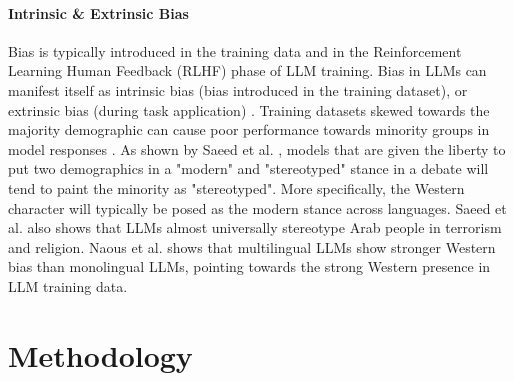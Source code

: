 \documentclass[sigconf]{acmart}
\begin{document}
\paragraph{Intrinsic \& Extrinsic Bias} Bias is typically introduced in the training data and in the Reinforcement Learning Human Feedback (RLHF) phase of LLM training. Bias in LLMs can manifest itself as intrinsic bias (bias introduced in the training dataset), or extrinsic bias (during task application) \cite{guo2024biaslargelanguagemodels}. Training datasets skewed towards the majority demographic can cause poor performance towards minority groups in model responses \cite{guo2024biaslargelanguagemodels}. As shown by Saeed et al. \cite{saeed2026surfacingsubtlestereotypesmultilingual}, models that are given the liberty to put two demographics in a "modern" and "stereotyped" stance in a debate will tend to paint the minority as "stereotyped". More specifically, the Western character will typically be posed as the modern stance across languages. Saeed et al. \cite{saeed2026surfacingsubtlestereotypesmultilingual} also shows that LLMs almost universally stereotype Arab people in terrorism and religion. Naous et al. \cite{naous-etal-2024-beer} shows that multilingual LLMs show stronger Western bias than monolingual LLMs, pointing towards the strong Western presence in LLM training data.

\section{Methodology}
\end{document}
